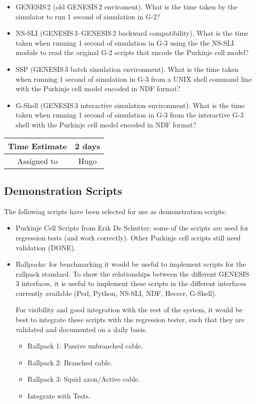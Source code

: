 \documentclass[12pt]{article}
\begin{document}
\begin{itemize}
\item GENESIS\,2 (old GENESIS\,2 enviroment).  What is the time taken
  by the simulator to run 1 second of simulation in G-2?
\item NS-SLI (GENESIS\,3--GENESIS\,2 backward compatibility).  What is
  the time taken when running 1 second of simulation in G-3 using the
  the NS-SLI module to read the original G-2 scripts that encode the
  Purkinje cell model?
\item SSP (GENESIS\,3 batch simulation environment).  What is the time
  taken when running 1 second of simulation in G-3 from a UNIX shell
  command line with the Purkinje cell model encoded in NDF format?
\item G-Shell (GENESIS\,3 interactive simulation environment).  What
  is the time taken when running 1 second of simulation in G-3 from
  the interactive G-3 shell with the Purkinje cell model encoded in
  NDF format?
\end{itemize}

\begin{center}
  \vspace{5mm}
  \centering
  \begin{tabular}{|c|c|}
    \hline
    Time Estimate
    & 2 days \\
    \hline
    Assigned to
    & Hugo \\
    \hline
  \end{tabular}
\end{center}


\subsection{Demonstration Scripts}

The following scripts have been selected for use as demonstration
scripts:

\begin{itemize}
\item Purkinje Cell Scripts from Erik De Schutter: some of the scripts
  are used for regression tests (and work correctly).  Other Purkinje
  cell scripts still need validation (DONE).
\item Rallpacks: for benchmarking it would be useful to implement
  scripts for the rallpack standard.  To show the relationships
  between the different GENESIS\,3 interfaces, it is useful to
  implement these scripts in the different interfaces currently
  available (Perl, Python, NS-SLI, NDF, Heccer, G-Shell).

  For visibility and good integration with the rest of the system, it
  would be best to integrate these scripts with the regression tester,
  such that they are validated and documented on a daily basis.
  \begin{itemize}
  \item Rallpack 1: Passive unbranched cable.
  \item Rallpack 2: Branched cable.
  \item Rallpack 3: Squid axon/Active cable.
  \item Integrate with Tests.
  \end{itemize}
\end{itemize}
\end{document}
